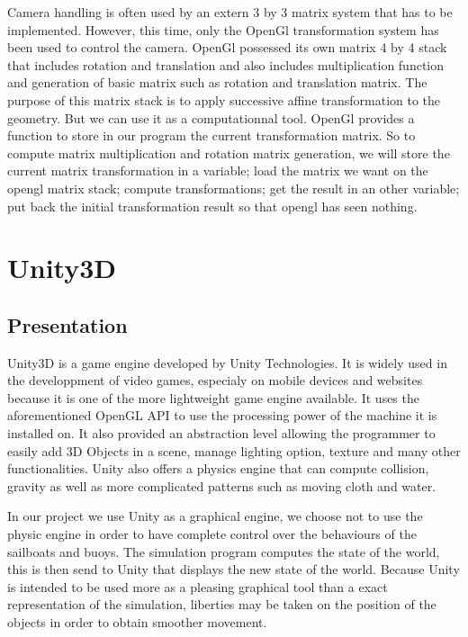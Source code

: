 \documentclass[a4paper]{report}
\begin{document}
Camera handling is often used by an extern 3 by 3 matrix system that has to be implemented. However, this time, only the OpenGl transformation system has been used to control the camera. OpenGl possessed its own matrix 4 by 4 stack that includes rotation and translation and also includes multiplication function and generation of basic matrix such as rotation and translation matrix. The purpose of this matrix stack is to apply successive affine transformation to the geometry. But we can use it as a computationnal tool. OpenGl provides a function to store in our program the current transformation matrix. So to compute matrix multiplication and rotation matrix generation, we will store the current matrix transformation in a variable; load the matrix we want on the opengl matrix stack; compute transformations; get the result in an other variable; put back the initial transformation result so that opengl has seen nothing. 

\section{Unity3D}
\subsection{Presentation}


Unity3D is a game engine developed by Unity Technologies. It is widely used in the developpment of video games, especialy on mobile devices and websites because it is one of the more lightweight game engine available. It uses the aforementioned OpenGL API to use the processing power of the machine it is installed on. It also provided an abstraction level allowing the programmer to easily add 3D Objects in a scene, manage lighting option, texture and many other functionalities. Unity also offers a physics engine that can compute collision, gravity as well as more complicated patterns such as moving cloth and water. 

In our project we use Unity as a graphical engine, we choose not to use the physic engine in order to have complete control over the behaviours of the sailboats and buoys. The simulation program computes the state of the world, this is then send to Unity that displays the new state of the world. Because Unity is intended to be used more as a pleasing graphical tool than a exact representation of the simulation, liberties may be taken on the position of the objects in order to obtain smoother movement.
\end{document}
